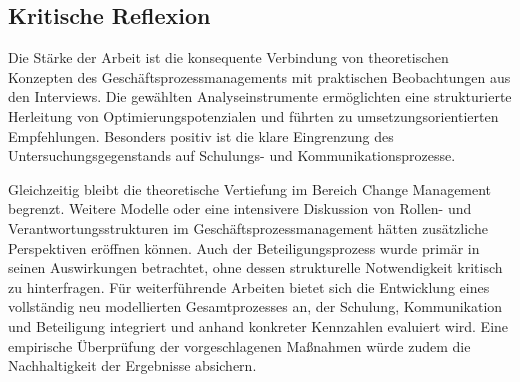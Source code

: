 \documentclass[
    12pt, 
    a4paper,
    ]{scrartcl} %
\begin{document}
\subsection{Kritische Reflexion}
Die Stärke der Arbeit ist die konsequente Verbindung von theoretischen Konzepten des Geschäftsprozessmanagements mit praktischen Beobachtungen aus den Interviews. Die gewählten Analyseinstrumente ermöglichten eine strukturierte Herleitung von Optimierungspotenzialen und führten zu umsetzungsorientierten Empfehlungen. Besonders positiv ist die klare Eingrenzung des Untersuchungsgegenstands auf Schulungs- und Kommunikationsprozesse.

Gleichzeitig bleibt die theoretische Vertiefung im Bereich Change Management begrenzt. Weitere Modelle oder eine intensivere Diskussion von Rollen- und Verantwortungsstrukturen im Geschäftsprozessmanagement hätten zusätzliche Perspektiven eröffnen können. Auch der Beteiligungsprozess wurde primär in seinen Auswirkungen betrachtet, ohne dessen strukturelle Notwendigkeit kritisch zu hinterfragen. Für weiterführende Arbeiten bietet sich die Entwicklung eines vollständig neu modellierten Gesamtprozesses an, der Schulung, Kommunikation und Beteiligung integriert und anhand konkreter Kennzahlen evaluiert wird. Eine empirische Überprüfung der vorgeschlagenen Maßnahmen würde zudem die Nachhaltigkeit der Ergebnisse absichern.


\end{document}
